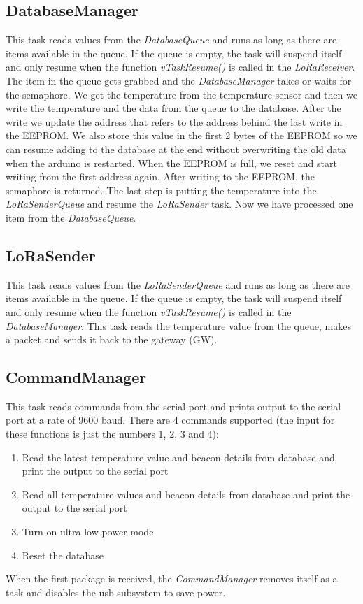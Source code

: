 \documentclass{scrartcl}
\begin{document}
\subsection{DatabaseManager}
This task reads values from the \textit{DatabaseQueue} and runs as long as there are items available in the queue.
If the queue is empty, the task will suspend itself and only resume when the function \textit{vTaskResume()} is called in the \textit{LoRaReceiver}.
The item in the queue gets grabbed and the \textit{DatabaseManager} takes or waits for the
semaphore. We get the temperature from the temperature sensor and then we write the temperature and the data from the queue to the database.
After the write we update the address that refers to the address behind the last write in the EEPROM. We also store this value in the first
2 bytes of the EEPROM so we can resume adding to the database at the end without overwriting the old data when the arduino is restarted.
When the EEPROM is full, we reset and start writing from the first address again. After writing to the EEPROM, the semaphore is returned.
The last step is putting the temperature into the \textit{LoRaSenderQueue} and resume the \textit{LoRaSender} task.
Now we have processed one item from the \textit{DatabaseQueue}.

\newpage

\subsection{LoRaSender}
This task reads values from the \textit{LoRaSenderQueue} and runs as long as there are items available in the queue.
If the queue is empty, the task will suspend itself and only resume when the function \textit{vTaskResume()} is called in the \textit{DatabaseManager}.
This task reads the temperature value from the queue, makes a packet and sends it back to the gateway (GW).

\subsection{CommandManager}
This task reads commands from the serial port and prints output to the serial port at a rate of 9600 baud.
There are 4 commands supported (the input for these functions is just the numbers 1, 2, 3 and 4):
\begin{enumerate}
    \item Read the latest temperature value and beacon details from database and print the output to the serial port
    \item Read all temperature values and beacon details from database and print the output to the serial port
    \item Turn on ultra low-power mode
    \item Reset the database
\end{enumerate}
When the first package is received, the \textit{CommandManager} removes itself as a task and disables the usb subsystem to save power.
\end{document}
